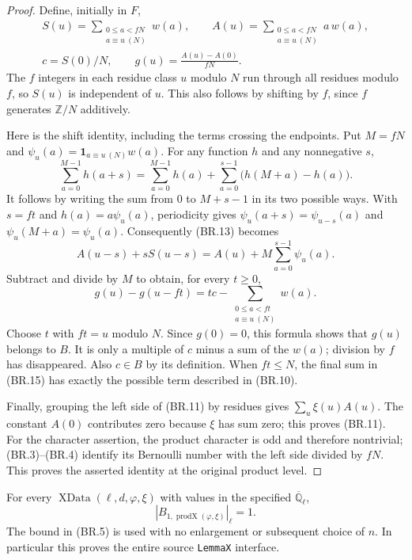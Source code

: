\begin{proof}
Define, initially in $F$,
\[
 \begin{gathered}
 S(u)=\sum_{\substack{0\le a<fN\\a\equiv u\ (N)}}w(a),
 \qquad
 A(u)=\sum_{\substack{0\le a<fN\\a\equiv u\ (N)}}a\,w(a),\\
 c=S(0)/N,\qquad g(u)=\frac{A(u)-A(0)}{fN}.
 \end{gathered}
 \tag{BR.12}
\]
The $f$ integers in each residue class $u$ modulo $N$ run through
all residues modulo $f$, so $S(u)$ is independent of $u$.
This also follows by shifting by $f$, since $f$ generates
$\mathbb Z/N$ additively.

Here is the shift identity, including the terms crossing the endpoints.
Put $M=fN$ and
$\psi_u(a)=\mathbf1_{a\equiv u\ (N)}w(a)$.
For any function $h$ and any nonnegative $s$,
\[
 \sum_{a=0}^{M-1}h(a+s)
 =\sum_{a=0}^{M-1}h(a)
   +\sum_{a=0}^{s-1}\bigl(h(M+a)-h(a)\bigr).
 \tag{BR.13}
\]
It follows by writing the sum from $0$ to $M+s-1$ in its two
possible ways.  With $s=ft$ and $h(a)=a\psi_u(a)$, periodicity gives
$\psi_u(a+s)=\psi_{u-s}(a)$ and $\psi_u(M+a)=\psi_u(a)$.
Consequently (BR.13) becomes
\[
 A(u-s)+sS(u-s)
          =A(u)+M\sum_{a=0}^{s-1}\psi_u(a).
 \tag{BR.14}
\]
Subtract and divide by $M$ to obtain, for every $t\ge0$,
\[
 g(u)-g(u-ft)=tc-
            \sum_{\substack{0\le a<ft\\a\equiv u\ (N)}}w(a).
 \tag{BR.15}
\]
Choose $t$ with $ft=u$ modulo $N$.  Since $g(0)=0$, this formula
shows that $g(u)$ belongs to $B$.  It is only a multiple of $c$
minus a sum of the $w(a)$; division by $f$ has disappeared.
Also $c\in B$ by its definition.  When $ft\le N$, the final sum
in (BR.15) has exactly the possible term described in (BR.10).

Finally, grouping the left side of (BR.11) by residues gives
$\sum_u\xi(u)A(u)$.
The constant $A(0)$ contributes zero because $\xi$ has sum zero;
this proves (BR.11).
For the character assertion, the product character is odd and
therefore nontrivial; (BR.3)--(BR.4) identify its Bernoulli number
with the left side divided by $fN$.  This proves the asserted
identity at the original product level.
\end{proof}

\begin{proposition}
\label{prop:br-lemma-x}
For every $\operatorname{XData}(\ell,d,\varphi,\xi)$ with values in
the specified $\overline{\mathbb Q}_\ell$,
\[
             |B_{1,\operatorname{prodX}(\varphi,\xi)}|_\ell=1.
             \tag{BR.16}
\]
The bound in (BR.5) is used with no enlargement or subsequent choice
of $n$.  In particular this proves the entire source
\texttt{LemmaX} interface.
\end{proposition}

